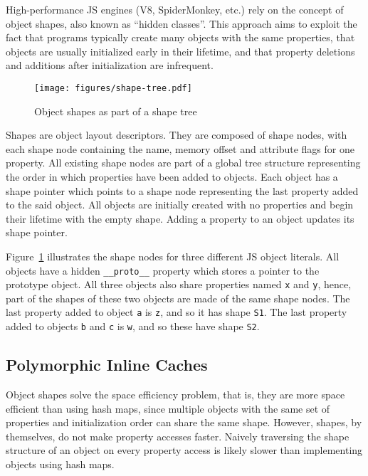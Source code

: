 \documentclass[preprint]{sigplanconf}
\begin{document}
High-performance JS engines (V8, SpiderMonkey, etc.) rely on the concept of
object shapes, also known as ``hidden classes''. This approach aims to exploit
the fact that programs typically create many objects with the same properties,
that objects are usually initialized early in their lifetime, and that
property deletions and additions after initialization are infrequent.

\begin{figure}[tb]
\begin{center}
\texttt{[image: figures/shape-tree.pdf]}
\end{center}
\caption{Object shapes as part of a shape tree\label{fig:shape-tree}}
\end{figure}

Shapes are object layout descriptors. They are composed of
shape nodes, with each shape node containing the name, memory offset and
attribute flags for one property. All existing shape nodes are part of a global
tree structure representing the order in which properties have been added to
objects. Each object has a shape pointer which points to a shape node
representing the last property added to the said object.
All objects are initially created with no properties and begin their lifetime
with the empty shape. Adding a property to an object updates its shape pointer.

Figure~\ref{fig:shape-tree} illustrates the shape nodes for three different
JS object literals. All objects have a hidden {\tt \_\_proto\_\_} property
which stores a pointer to the prototype object. All three objects also share
properties named {\tt x} and {\tt y}, hence, part of the shapes of these two
objects are made of the same shape nodes. The last property added to object
{\tt a} is {\tt z}, and so it has shape {\tt S1}. The last property added to
objects {\tt b} and {\tt c} is {\tt w}, and so these have shape {\tt S2}.

\subsection{Polymorphic Inline Caches}\label{sec:pic}

Object shapes solve the space efficiency problem, that is, they are more space
efficient than using hash maps, since multiple objects with the same set of
properties and initialization order can share the same shape. However, shapes,
by themselves, do not make property accesses faster. Naively traversing the
shape structure of an object on every property access is likely slower
than implementing objects using hash maps.
\end{document}
